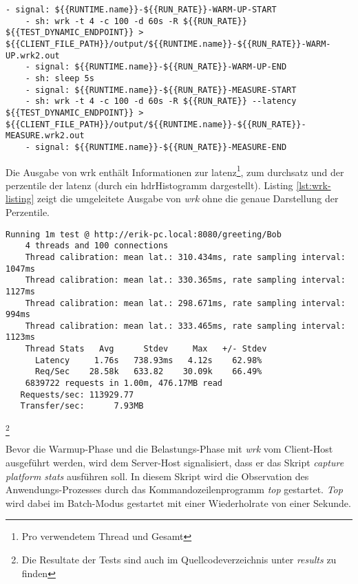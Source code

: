 \begin{lstlisting}[caption=Auszug des qDup Skripts generate load, captionpos=b, label=lst:generateLoad]
    - signal: ${{RUNTIME.name}}-${{RUN_RATE}}-WARM-UP-START
    - sh: wrk -t 4 -c 100 -d 60s -R ${{RUN_RATE}} ${{TEST_DYNAMIC_ENDPOINT}} > ${{CLIENT_FILE_PATH}}/output/${{RUNTIME.name}}-${{RUN_RATE}}-WARM-UP.wrk2.out
    - signal: ${{RUNTIME.name}}-${{RUN_RATE}}-WARM-UP-END
    - sh: sleep 5s
    - signal: ${{RUNTIME.name}}-${{RUN_RATE}}-MEASURE-START
    - sh: wrk -t 4 -c 100 -d 60s -R ${{RUN_RATE}} --latency ${{TEST_DYNAMIC_ENDPOINT}} > ${{CLIENT_FILE_PATH}}/output/${{RUNTIME.name}}-${{RUN_RATE}}-MEASURE.wrk2.out
    - signal: ${{RUNTIME.name}}-${{RUN_RATE}}-MEASURE-END
   \end{lstlisting}

Die Ausgabe von wrk enthält Informationen zur \Gls{latenz}\footnote{Pro verwendetem Thread und Gesamt},
zum \Gls{durchsatz} und der \Gls{perzentile} der \Gls{latenz} (durch ein \Gls{hdrHistogramm} dargestellt).
Listing \ref*{lst:wrk-listing} zeigt die umgeleitete Ausgabe von \textit{wrk} ohne die genaue Darstellung der Perzentile.

\begin{lstlisting}[caption=Beispiel für Ausgabe von wrk,captionpos=b, label=lst:wrk-listing]
    Running 1m test @ http://erik-pc.local:8080/greeting/Bob
    4 threads and 100 connections
    Thread calibration: mean lat.: 310.434ms, rate sampling interval: 1047ms
    Thread calibration: mean lat.: 330.365ms, rate sampling interval: 1127ms
    Thread calibration: mean lat.: 298.671ms, rate sampling interval: 994ms
    Thread calibration: mean lat.: 333.465ms, rate sampling interval: 1123ms
    Thread Stats   Avg      Stdev     Max   +/- Stdev
      Latency     1.76s   738.93ms   4.12s    62.98%
      Req/Sec    28.58k   633.82    30.09k    66.49%
    6839722 requests in 1.00m, 476.17MB read
   Requests/sec: 113929.77
   Transfer/sec:      7.93MB
   \end{lstlisting}\footnote{Die Resultate der Tests sind auch im Quellcodeverzeichnis unter \textit{\/results} zu finden}

Bevor die Warmup-Phase und die Belastungs-Phase mit \textit{wrk} vom Client-Host ausgeführt werden, wird dem Server-Host signalisiert, dass
er das Skript \textit{capture platform stats} ausführen soll.
In diesem Skript wird die Observation des Anwendungs-Prozesses durch das Kommandozeilenprogramm \textit{top} gestartet.
\textit{Top} wird dabei im Batch-Modus gestartet mit einer Wiederholrate von einer Sekunde.

